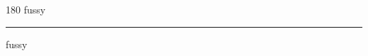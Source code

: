 
\begin{frame}
\begin{center}
\begin{turn}{180}
{\fontsize{2.5cm}{1em}\selectfont fussy}
\end{turn}
\vspace{1em}\par  
\hrule
\vspace{1em}\par  
{\fontsize{2.5cm}{1em}\selectfont fussy}
\end{center}
\end{frame}
